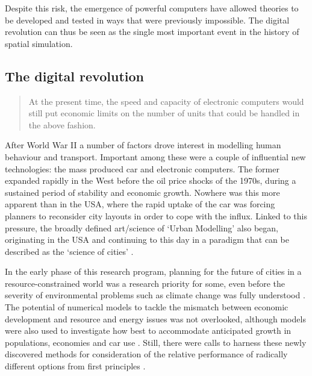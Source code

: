 Despite this risk, the emergence of powerful computers have allowed theories to
be developed and tested in ways that were previously impossible. The digital
revolution can thus be seen as the single most important event in the history
of spatial simulation.

\subsection{The digital revolution}
\label{s:digirev}
\begin{quote}
 At the present time, the speed and capacity
of electronic computers would still put economic limits on the number of units
that could be handled in the above fashion.
\end{quote}

After World War II a number of factors drove interest in modelling human
behaviour and transport. Important among these were a couple of influential new
technologies: the mass produced car and electronic computers. The former
expanded rapidly in the West before the oil price shocks of the
1970s, during a sustained period of stability and economic growth. Nowhere
was this more apparent than in the USA, where the rapid uptake of the car was
forcing planners to reconsider city layouts in order to cope with the influx.
Linked to this pressure, the broadly defined art/science of `Urban Modelling'
also
began, originating in the USA \citep{batty1976urban} and continuing to this
day in a paradigm that can be described as the `science of cities' \citep{Batty2012}.

In the early phase of this research program, planning for the future
of cities in a resource-constrained world was a research priority for some,
even before the severity of environmental problems such as climate change was
fully understood \citep{Rouse1975}. The potential of numerical models to tackle
the mismatch between economic development and resource and energy issues was
not overlooked, although models were also used to investigate
how best to accommodate anticipated growth in populations, economies and
car use \citep{Irwin1973-simulation}.
Still, there were calls to harness these newly discovered methods
for consideration of the relative performance of
radically different options from first principles \citep{manheim1968search, TUI1972}.

